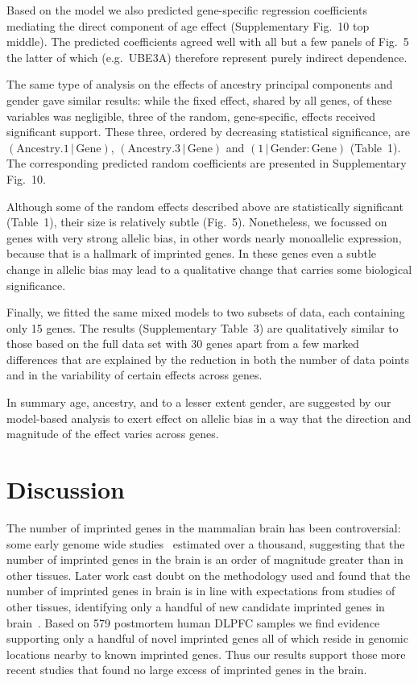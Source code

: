 \documentclass[letterpaper]{article}
\begin{document}
Based on the model we also predicted
gene-specific regression coefficients mediating the direct component of age
effect (Supplementary Fig.~10 top middle).  The predicted coefficients
agreed well with all but a few panels of Fig.~5 the latter of
which (e.g.~UBE3A) therefore represent purely indirect dependence.

The same type of analysis on the effects of ancestry principal components and
gender gave similar results: while the fixed effect, shared by all genes, of
these variables was negligible, three of the random, gene-specific, effects
received significant support.  These three, ordered by decreasing
statistical significance, are
\((\mathrm{Ancestry.1}\,|\,\mathrm{Gene})\),
\((\mathrm{Ancestry.3}\,|\,\mathrm{Gene})\) and
\((1\,|\,\mathrm{Gender}:\mathrm{Gene})\) (Table~1).  The
corresponding predicted random coefficients are presented in
Supplementary Fig.~10.

Although some of the random effects described above are statistically
significant (Table~1), their size is relatively subtle (Fig.~5).  Nonetheless,
we focussed on genes with very strong allelic bias, in other words nearly
monoallelic expression, because that is a hallmark of imprinted genes.  In
these genes even a subtle change in allelic bias may lead to a qualitative
change that carries some biological significance.

Finally, we fitted the same mixed models to two subsets of data, each
containing only 15 genes.  The results (Supplementary Table~3) are
qualitatively similar to those based on the full data set with 30 genes apart
from a few marked differences that are explained by the reduction in both the
number of data points and in the variability of certain effects across genes.

In summary age, ancestry, and to a lesser extent gender, are suggested by our
model-based analysis to exert effect on allelic bias in a way that the
direction and magnitude of the effect varies across genes.

\section*{Discussion}

The number of imprinted genes in the mammalian brain has been controversial:
some early genome wide studies~\cite{Gregg2010a,Gregg2010} estimated over a
thousand, suggesting that the number of imprinted genes in the brain is an
order of magnitude greater than in other tissues.  Later work cast doubt on
the methodology used and found that the number of imprinted genes in brain is
in line with expectations from studies of other tissues, identifying only a
handful of new candidate imprinted genes in brain~\cite{Baran2015,DeVeale2012,Perez2015}.
Based on 579 postmortem human DLPFC
samples we find evidence supporting only a handful of novel imprinted genes
all of which reside in genomic locations nearby to known imprinted genes.
Thus our results support those more recent studies that found no large excess
of imprinted genes in the brain.
\end{document}
